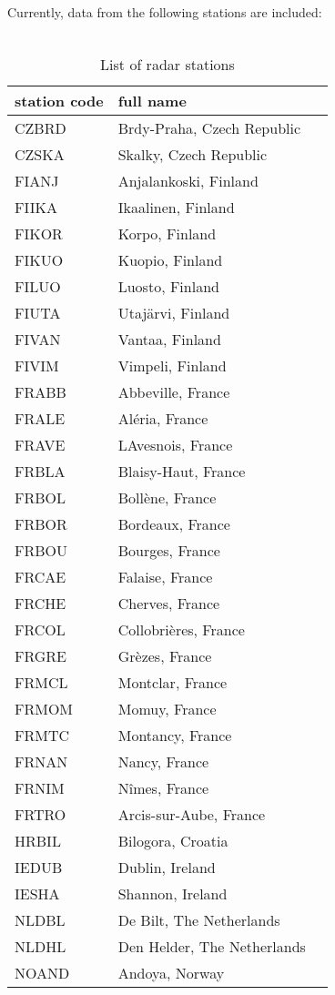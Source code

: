 Currently, data from the following stations are included:\\
\\
\begin{longtable}[htb]{lll}
\caption{List of radar stations}
\hline
\textbf{station code} & \textbf{full name}\\
\hline
\endhead
CZBRD & Brdy-Praha, Czech Republic\\
CZSKA & Skalky, Czech Republic \\
FIANJ & Anjalankoski, Finland \\
FIIKA & Ikaalinen, Finland \\
FIKOR & Korpo, Finland \\
FIKUO & Kuopio, Finland \\
FILUO & Luosto, Finland \\
FIUTA & Utaj\"{a}rvi, Finland \\
FIVAN & Vantaa, Finland \\
FIVIM & Vimpeli, Finland \\
FRABB & Abbeville, France \\
FRALE & Al\'{e}ria, France \\
FRAVE & LAvesnois, France \\
FRBLA & Blaisy-Haut, France \\
FRBOL & Boll\`{e}ne, France \\
FRBOR & Bordeaux, France \\
FRBOU & Bourges, France \\
FRCAE & Falaise, France \\
FRCHE & Cherves, France \\
FRCOL & Collobri\`{e}res, France \\
FRGRE & Gr\`{e}zes, France \\
FRMCL & Montclar, France \\
FRMOM & Momuy, France \\
FRMTC & Montancy, France \\
FRNAN & Nancy, France \\
FRNIM & N\^{i}mes, France \\
FRTRO & Arcis-sur-Aube, France \\
HRBIL & Bilogora, Croatia \\
IEDUB & Dublin, Ireland  \\
IESHA & Shannon, Ireland  \\
NLDBL & De Bilt, The Netherlands     \\
NLDHL & Den Helder, The Netherlands \\
NOAND & Andoya, Norway \\

\end{longtable}
